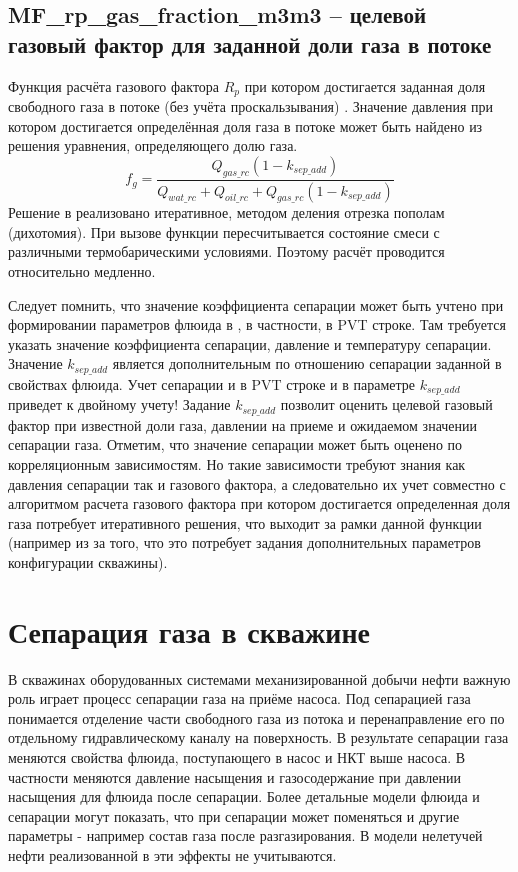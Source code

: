 


\subsection{MF\_rp\_gas\_fraction\_m3m3 – целевой газовый фактор для заданной доли газа в потоке}
Функция расчёта газового фактора $R_p$ при котором достигается заданная доля свободного газа в потоке (без учёта проскальзывания) . 
Значение давления при котором достигается определённая доля газа в потоке может быть найдено из решения уравнения, определяющего долю газа. 
$$f_g = \frac{Q_{gas\_rc} (1-k_{sep\_add})}{Q_{wat\_rc}+Q_{oil\_rc}+Q_{gas\_rc}(1-k_{sep\_add})} $$
Решение в \unf{} реализовано итеративное, методом деления отрезка пополам (дихотомия). При вызове функции пересчитывается состояние смеси с различными термобарическими условиями. Поэтому расчёт проводится относительно медленно. 

Следует помнить, что значение коэффициента сепарации может быть учтено при формировании параметров флюида в \unf{}, в частности, в PVT строке. Там требуется указать значение коэффициента сепарации, давление и температуру сепарации. Значение $k_{sep\_add}$ является дополнительным по отношению сепарации заданной в свойствах флюида. Учет сепарации и в PVT строке и в параметре $k_{sep\_add}$ приведет к двойному учету!
Задание $k_{sep\_add}$ позволит оценить целевой газовый фактор при известной доли газа, давлении на приеме и ожидаемом значении сепарации газа. Отметим, что значение сепарации может быть оценено по корреляционным зависимостям. Но такие зависимости требуют знания как давления сепарации так и газового фактора, а следовательно их учет совместно с алгоритмом расчета газового фактора при котором достигается определенная доля газа потребует итеративного решения, что выходит за рамки данной функции (например из за того, что это потребует задания дополнительных параметров конфигурации скважины).


\section{Сепарация газа в скважине}
В скважинах оборудованных системами механизированной добычи нефти важную роль играет процесс сепарации газа на приёме насоса. Под сепарацией газа понимается отделение части свободного газа из потока и перенаправление его по отдельному гидравлическому каналу на поверхность. В результате сепарации газа меняются свойства флюида, поступающего в насос и НКТ выше насоса. В частности меняются давление насыщения и газосодержание при давлении насыщения для флюида после сепарации. Более детальные модели флюида и сепарации могут показать, что при сепарации может поменяться и другие параметры - например состав газа после разгазирования. В модели нелетучей нефти реализованной в \unf{} эти эффекты не учитываются.


